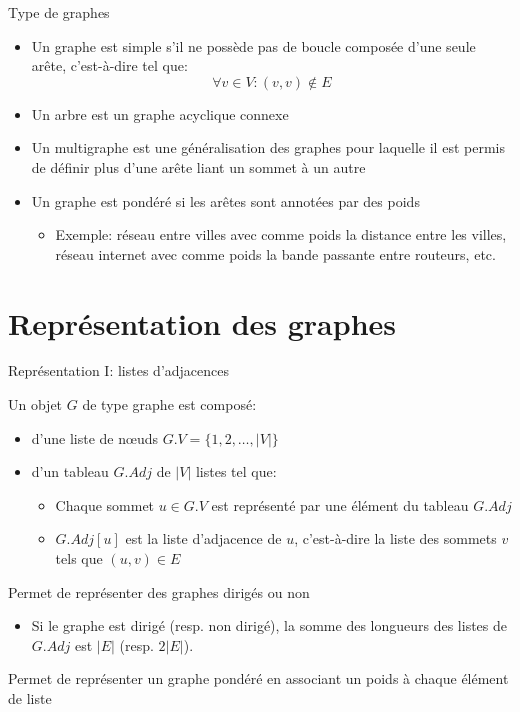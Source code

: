 \begin{frame}{Type de graphes}
\begin{itemize}
\item Un graphe est \alert{simple} s'il ne possède pas de boucle composée d'une seule arête, c'est-à-dire tel que:
$$\forall v \in V: (v,v)\notin E$$
\item Un \alert{arbre} est un graphe acyclique connexe
\item Un \alert{multigraphe} est une généralisation des graphes pour laquelle
  il est permis de définir plus d'une arête liant un sommet à un autre

\bigskip

\item Un graphe est \alert{pondéré} si les arêtes sont annotées par des \alert{poids}
\begin{itemize}
\item Exemple: réseau entre villes avec comme poids la distance entre
  les villes, réseau internet avec comme poids la bande passante entre routeurs, etc.
\end{itemize}
\end{itemize}
\end{frame}

\section{Représentation des graphes}

\begin{frame}{Représentation I: listes d'adjacences}

Un objet $G$ de type graphe est composé:
\begin{itemize}
\item d'une liste de n\oe uds $G.V=\{1,2,\ldots,|V|\}$
\item d'un tableau $G.Adj$ de $|V|$ listes tel que:
\begin{itemize}
\item Chaque sommet $u\in G.V$ est représenté par une élément du tableau $G.Adj$
\item $G.Adj[u]$ est la liste d'adjacence de $u$, c'est-à-dire la
  liste des sommets $v$ tels que $(u,v)\in E$
\end{itemize}
\end{itemize}

\bigskip

Permet de représenter des graphes dirigés ou non
\begin{itemize}
\item Si le graphe est dirigé (resp. non dirigé), la somme des longueurs des listes de $G.Adj$ est 
$|E|$ (resp. $2|E|$).
\end{itemize}

\bigskip

Permet de représenter un graphe pondéré en associant un poids à chaque
élément de liste

\end{frame}


